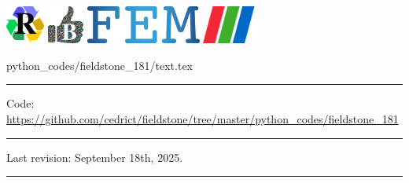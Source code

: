 \noindent
\includegraphics[height=1.25cm]{images/pictograms/replication}
\includegraphics[height=1.25cm]{images/pictograms/benchmark}
\includegraphics[height=1.25cm]{images/pictograms/FEM}
\includegraphics[height=1.25cm]{images/pictograms/paraview}


\begin{flushright} {\tiny {\color{gray} python\_codes/fieldstone\_181/text.tex}} \end{flushright}

%

\par\noindent\rule{\textwidth}{0.4pt}

\begin{center}
\inpython
{\small Code: \url{https://github.com/cedrict/fieldstone/tree/master/python_codes/fieldstone_181}}
\end{center}

\par\noindent\rule{\textwidth}{0.4pt}

Last revision: September 18th, 2025.

\par\noindent\rule{\textwidth}{0.4pt}



